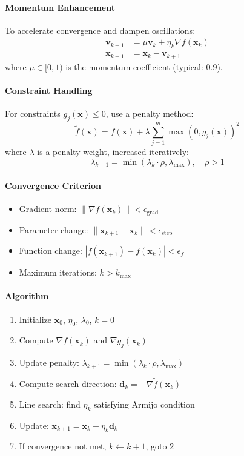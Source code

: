 \paragraph{Momentum Enhancement}
To accelerate convergence and dampen oscillations:
\begin{align}
\mathbf{v}_{k+1} &= \mu \mathbf{v}_k + \eta_k \nabla f(\mathbf{x}_k) \\
\mathbf{x}_{k+1} &= \mathbf{x}_k - \mathbf{v}_{k+1}
\end{align}
where $\mu \in [0, 1)$ is the momentum coefficient (typical: $0.9$).

\paragraph{Constraint Handling}
For constraints $g_j(\mathbf{x}) \leq 0$, use a penalty method:
\begin{equation}
\tilde{f}(\mathbf{x}) = f(\mathbf{x}) + \lambda \sum_{j=1}^{m} \max(0, g_j(\mathbf{x}))^2
\end{equation}
where $\lambda$ is a penalty weight, increased iteratively:
\begin{equation}
\lambda_{k+1} = \min(\lambda_k \cdot \rho, \lambda_{\max}), \quad \rho > 1
\end{equation}

\paragraph{Convergence Criterion}
\begin{itemize}
\item Gradient norm: $\|\nabla f(\mathbf{x}_k)\| < \epsilon_{\text{grad}}$
\item Parameter change: $\|\mathbf{x}_{k+1} - \mathbf{x}_k\| < \epsilon_{\text{step}}$
\item Function change: $|f(\mathbf{x}_{k+1}) - f(\mathbf{x}_k)| < \epsilon_f$
\item Maximum iterations: $k > k_{\max}$
\end{itemize}

\paragraph{Algorithm}
\begin{enumerate}
\item Initialize $\mathbf{x}_0$, $\eta_0$, $\lambda_0$, $k = 0$
\item Compute $\nabla f(\mathbf{x}_k)$ and $\nabla g_j(\mathbf{x}_k)$
\item Update penalty: $\lambda_{k+1} = \min(\lambda_k \cdot \rho, \lambda_{\max})$
\item Compute search direction: $\mathbf{d}_k = -\nabla \tilde{f}(\mathbf{x}_k)$
\item Line search: find $\eta_k$ satisfying Armijo condition
\item Update: $\mathbf{x}_{k+1} = \mathbf{x}_k + \eta_k \mathbf{d}_k$
\item If convergence not met, $k \leftarrow k+1$, goto 2
\end{enumerate}


